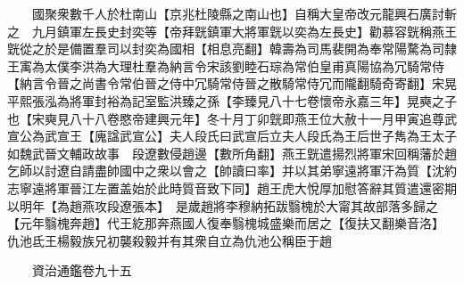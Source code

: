 　　國聚衆數千人於杜南山【京兆杜陵縣之南山也】自稱大皇帝改元龍興石廣討斬之　九月鎮軍左長史封奕等【帝拜皝鎮軍大將軍皝以奕為左長史】勸慕容皝稱燕王皝從之於是備置羣司以封奕為國相【相息亮翻】韓壽為司馬裴開為奉常陽騖為司隸王㝢為太僕李洪為大理杜羣為納言令宋該劉睦石琮為常伯皇甫真陽協為冗騎常侍【納言令晉之尚書令常伯晉之侍中冗騎常侍晉之散騎常侍冗而隴翻騎奇寄翻】宋晃平熙張泓為將軍封裕為記室監洪臻之孫【李臻見八十七卷懷帝永嘉三年】晃奭之子也【宋奭見八十八卷愍帝建興元年】冬十月丁卯皝即燕王位大赦十一月甲寅追尊武宣公為武宣王【廆諡武宣公】夫人段氏曰武宣后立夫人段氏為王后世子雋為王太子如魏武晉文輔政故事　段遼數侵趙邊【數所角翻】燕王皝遣揚烈將軍宋回稱藩於趙乞師以討遼自請盡帥國中之衆以會之【帥讀曰率】并以其弟寧遠將軍汗為質【沈約志寧遠將軍晉江左置盖始於此時質音致下同】趙王虎大悅厚加慰答辭其質遣還密期以明年【為趙燕攻段遼張本】　是歲趙將李穆納拓跋翳槐於大甯其故部落多歸之【元年翳槐奔趙】代王紇那奔燕國人復奉翳槐城盛樂而居之【復扶又翻樂音洛】　仇池氐王楊毅族兄初襲殺毅并有其衆自立為仇池公稱臣于趙

　　資治通鑑卷九十五


    


 


 



 

 
  







 


　　
　　
　
　
　


　　

　















	
	










































